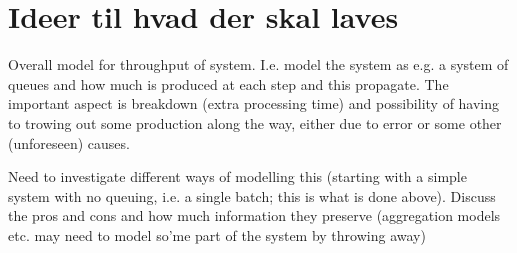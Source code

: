 \documentclass[../Thesis.tex]{subfiles}
\begin{document}
\chapter{Ideer til hvad der skal laves}

Overall model for throughput of system. I.e. model the system as e.g. a system of queues and how much is produced at each step and this propagate. The important aspect is breakdown (extra processing time) and possibility of having to trowing out some production along the way, either due to error or some other (unforeseen) causes.

Need to investigate different ways of modelling this (starting with a simple system with no queuing, i.e. a single batch; this is what is done above). Discuss the pros and cons and how much information they preserve (aggregation models etc. may need to model so'me part of the system by throwing away)
\end{document}
